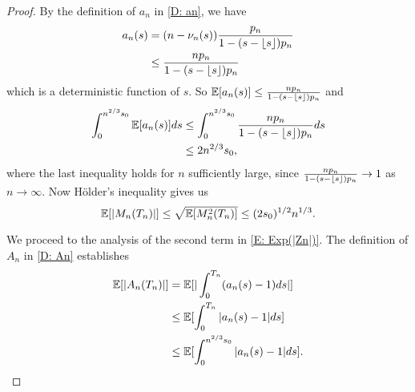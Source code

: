 \begin{proof}
    By the definition of $a_n$ in \eqref{D: an}, we have
    \begin{equation}
    \begin{aligned}
    a_n(s) &= (n - \nu_n(s)) \frac{p_n}{1 - (s - \lfloor s\rfloor)p_n} \\
    &\leq \frac{n p_n}{1 - (s - \lfloor s\rfloor)p_n}
    \end{aligned}
    \end{equation}
    which is a deterministic function of $s$. So
    $ \mathbb{E}[a_n(s)] \leq \frac{n p_n}{1 - (s - \lfloor s\rfloor)p_n} $
    and
    \begin{equation}
    \begin{aligned}
    \int_{0}^{n^{2 / 3}s_0} \mathbb{E}[a_n(s)] ds 
    &\leq \int_{0}^{n^{2 / 3}s_0}\frac{n p_n}{1 - (s - \lfloor s\rfloor)p_n}ds \\
    &\leq 2n^{2 / 3}s_0,
    \end{aligned}
    \end{equation}
    where the last inequality holds for $n$ sufficiently large, since 
    $\frac{n p_n}{1 - (s - \lfloor s\rfloor)p_n} \rightarrow 1$
    as $n \rightarrow \infty$.
    Now Hölder's inequality gives us
    \begin{equation} \label{E: Exp(Mn)}
    \mathbb{E}[|M_n(T_n)|] \leq \sqrt{\mathbb{E}[M^2_n(T_n)]} \leq (2s_0)^{1/2}n^{1 / 3}.
    \end{equation}
    
    We proceed to the analysis of the second term in \eqref{E: Exp(|Zn|)}.
    The definition of $A_n$ in \eqref{D: An} establishes
    \begin{equation}
    \begin{aligned}
    \mathbb{E}[|A_n(T_n)|] 
    &= \mathbb{E}[|\int_{0}^{T_n}(a_n(s) -1)ds |] \\
    &\leq \mathbb{E}[\int_{0}^{T_n} |a_n(s)-1|ds] \\
    &\leq \mathbb{E}[\int_{0}^{n^{2 / 3}s_0} |a_n(s)-1|ds].
    \end{aligned}
    \end{equation}
    

\end{proof}
